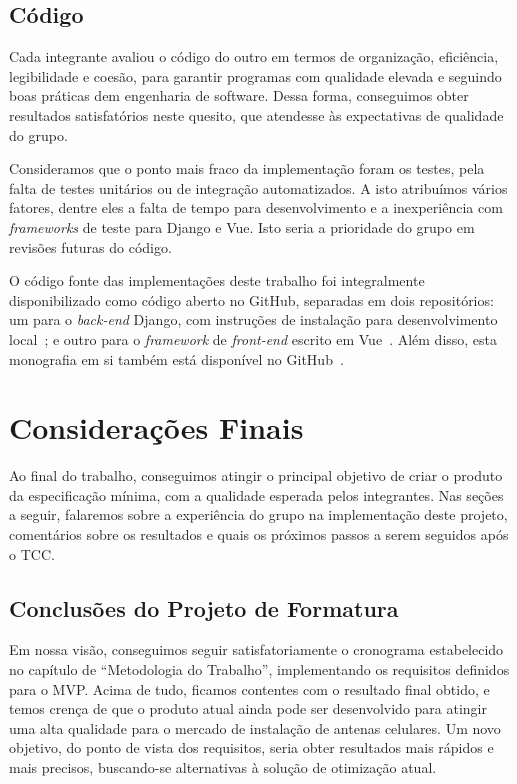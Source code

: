 \documentclass[]{politex}
\begin{document}

\section{Código}

Cada integrante avaliou o código do outro em termos de organização, eficiência,
legibilidade e coesão, para garantir programas com qualidade elevada e seguindo
boas práticas dem engenharia de software. Dessa forma, conseguimos obter
resultados satisfatórios neste quesito, que atendesse às expectativas de
qualidade do grupo.

Consideramos que o ponto mais fraco da implementação foram os testes, pela falta
de testes unitários ou de integração automatizados. A isto atribuímos vários
fatores, dentre eles a falta de tempo para desenvolvimento e a inexperiência com
\textit{frameworks} de teste para Django e Vue. Isto seria a prioridade do grupo
em revisões futuras do código.

O código fonte das implementações deste trabalho foi integralmente
disponibilizado como código aberto no GitHub, separadas em dois repositórios: um
para o \textit{back-end} Django, com instruções de instalação para
desenvolvimento local~\cite{repo-django}; e outro para o \textit{framework} de
\textit{front-end} escrito em Vue~\cite{repo-vue}. Além disso, esta monografia
em si também está disponível no GitHub~\cite{repo-tcc}.

\chapter{Considerações Finais}

Ao final do trabalho, conseguimos atingir o principal objetivo de criar o
produto da especificação mínima, com a qualidade esperada pelos integrantes. Nas
seções a seguir, falaremos sobre a experiência do grupo na implementação deste
projeto, comentários sobre os resultados e quais os próximos passos a serem
seguidos após o TCC.

\section{Conclusões do Projeto de Formatura}

Em nossa visão, conseguimos seguir satisfatoriamente o cronograma estabelecido
no capítulo de ``Metodologia do Trabalho'', implementando os requisitos
definidos para o MVP. Acima de tudo, ficamos contentes com o resultado final
obtido, e temos crença de que o produto atual ainda pode ser desenvolvido para
atingir uma alta qualidade para o mercado de instalação de antenas celulares. Um
novo objetivo, do ponto de vista dos requisitos, seria obter resultados mais
rápidos e mais precisos, buscando-se alternativas à solução de otimização atual.
\end{document}

